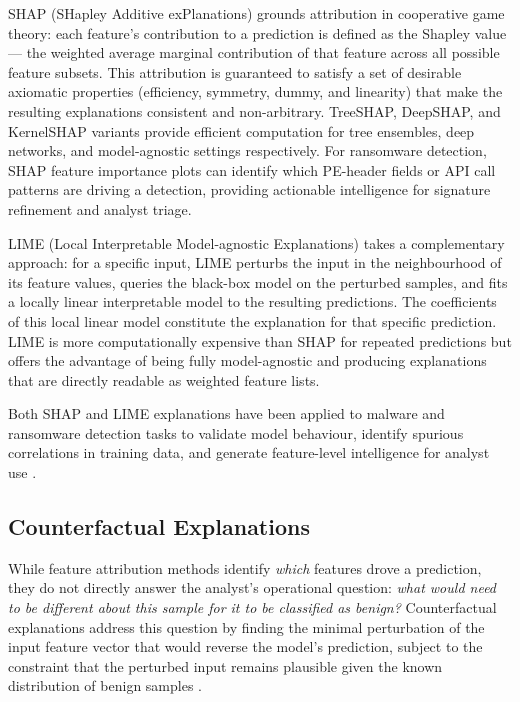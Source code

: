 SHAP (SHapley Additive exPlanations) \cite{lundberg2017shap} grounds attribution in
cooperative game theory: each feature's contribution to a prediction is defined as the
Shapley value — the weighted average marginal contribution of that feature across all
possible feature subsets.
This attribution is guaranteed to satisfy a set of desirable axiomatic properties (efficiency,
symmetry, dummy, and linearity) that make the resulting explanations consistent and
non-arbitrary.
TreeSHAP, DeepSHAP, and KernelSHAP variants provide efficient computation for tree ensembles,
deep networks, and model-agnostic settings respectively.
For ransomware detection, SHAP feature importance plots can identify which PE-header fields or
API call patterns are driving a detection, providing actionable intelligence for signature
refinement and analyst triage.

LIME (Local Interpretable Model-agnostic Explanations) \cite{ribeiro2016lime} takes a
complementary approach: for a specific input, LIME perturbs the input in the neighbourhood
of its feature values, queries the black-box model on the perturbed samples, and fits a
locally linear interpretable model to the resulting predictions.
The coefficients of this local linear model constitute the explanation for that specific
prediction.
LIME is more computationally expensive than SHAP for repeated predictions but offers the
advantage of being fully model-agnostic and producing explanations that are directly
readable as weighted feature lists.

Both SHAP and LIME explanations have been applied to malware and ransomware detection tasks
to validate model behaviour, identify spurious correlations in training data, and generate
feature-level intelligence for analyst use \cite{gulmez2024xran, Ispahany2024Survey}.

\subsection{Counterfactual Explanations}
\label{sec:lit_cf}

While feature attribution methods identify \emph{which} features drove a prediction, they do
not directly answer the analyst's operational question: \emph{what would need to be different
about this sample for it to be classified as benign?}
Counterfactual explanations address this question by finding the minimal perturbation of the
input feature vector that would reverse the model's prediction, subject to the constraint that
the perturbed input remains plausible given the known distribution of benign
samples \cite{Farzadpour2024Thresholding}.

